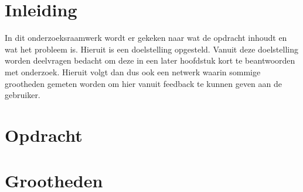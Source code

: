 \documentclass[12pt, a4paper, twoside]{article}
\numberwithin{equation}{section}
\begin{document}
    \makeTitlepage
    \onecolumn
    \tableofcontents
    \newpage

    \section{Inleiding}
    In dit onderzoeksraamwerk wordt er gekeken naar wat de opdracht inhoudt en wat het probleem is. Hieruit is een doelstelling opgesteld. Vanuit deze doelstelling worden deelvragen bedacht om deze in een later hoofdstuk kort te beantwoorden met onderzoek. Hieruit volgt dan dus ook een netwerk waarin sommige grootheden gemeten worden om hier vanuit feedback te kunnen geven aan de gebruiker. 

    \section{Opdracht}
    

    \newpage
    \section{Grootheden}
    

    \newpage    
    \printbibliography

    \appendix
\end{document}
